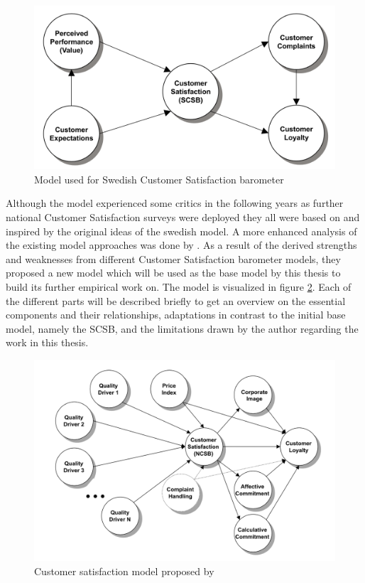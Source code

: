 \begin{figure}
	\centering
	\includegraphics[width=1.0\textwidth]{img/scsb.png}
	\caption{Model used for Swedish Customer Satisfaction barometer \cite{fornell1992national}}
	\label{fig:scsb}
\end{figure} 

Although the model experienced some critics in the following years as further national Customer Satisfaction surveys were deployed they all were based on and inspired by the original ideas of the swedish model. A more enhanced analysis of the existing model approaches was done by \cite{johnson2001evolution}. As a result of the derived strengths and weaknesses from different Customer Satisfaction barometer models, they proposed a new model which will be used as the base model by this thesis to build its further empirical work on. The model is visualized in figure \ref{fig:satisfactionModel}. Each of the different parts will be described briefly to get an overview on the essential components and their relationships, adaptations in contrast to the initial base model, namely the SCSB, and the limitations drawn by the author regarding the work in this thesis. 

\begin{figure}
	\centering
	\includegraphics[width=1.0\textwidth]{img/custSatisfaction.png}
	\caption{Customer satisfaction model proposed by \cite{johnson2001evolution}}
	\label{fig:satisfactionModel}
\end{figure} 


